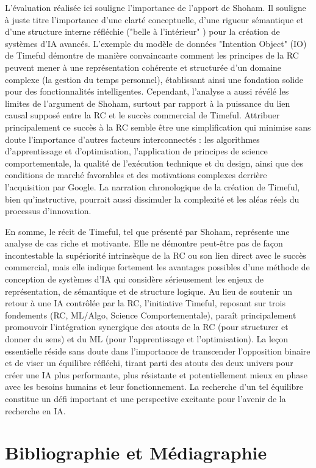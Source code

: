 \documentclass[11pt,a4paper]{article}
\begin{document}
L'évaluation réalisée ici souligne l'importance de l'apport de Shoham. Il souligne à juste titre l'importance d'une clarté conceptuelle, d'une rigueur sémantique et d'une structure interne réfléchie ("belle à l'intérieur" \citep{Shoham2015Why}) pour la création de systèmes d'IA avancés. L'exemple du modèle de données "Intention Object" (IO) de Timeful démontre de manière convaincante comment les principes de la RC peuvent mener à une représentation cohérente et structurée d'un domaine complexe (la gestion du temps personnel), établissant ainsi une fondation solide pour des fonctionnalités intelligentes. Cependant, l'analyse a aussi révélé les limites de l'argument de Shoham, surtout par rapport à la puissance du lien causal supposé entre la RC et le succès commercial de Timeful. Attribuer principalement ce succès à la RC semble être une simplification qui minimise sans doute l'importance d'autres facteurs interconnectés : les algorithmes d'apprentissage et d'optimisation, l'application de principes de science comportementale, la qualité de l’exécution technique et du design, ainsi que des conditions de marché favorables et des motivations complexes derrière l'acquisition par Google. La narration chronologique de la création de Timeful, bien qu'instructive, pourrait aussi dissimuler la complexité et les aléas réels du processus d'innovation. 


En somme, le récit de Timeful, tel que présenté par Shoham, représente une analyse de cas riche et motivante. Elle ne démontre peut-être pas de façon incontestable la supériorité intrinsèque de la RC ou son lien direct avec le succès commercial, mais elle indique fortement les avantages possibles d'une méthode de conception de systèmes d'IA qui considère sérieusement les enjeux de représentation, de sémantique et de structure logique. Au lieu de soutenir un retour à une IA contrôlée par la RC, l'initiative Timeful, reposant sur trois fondements (RC, ML/Algo, Science Comportementale), paraît principalement promouvoir l'intégration synergique des atouts de la RC (pour structurer et donner du sens) et du ML (pour l'apprentissage et l'optimisation). La leçon essentielle réside sans doute dans l'importance de transcender l'opposition binaire et de viser un équilibre réfléchi, tirant parti des atouts des deux univers pour créer une IA plus performante, plus résistante et potentiellement mieux en phase avec les besoins humains et leur fonctionnement. La recherche d'un tel équilibre constitue un défi important et une perspective excitante pour l'avenir de la recherche en IA. 

\tableofcontents 

\vspace{0.5em}
\section{Bibliographie et Médiagraphie} 
\label{sec:bibliographie}
\nocite{*}


\end{document}
